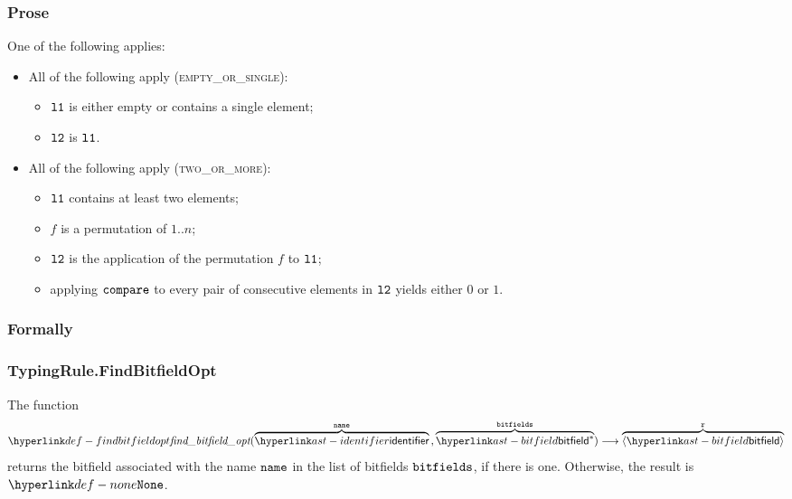 \subsubsection{Prose}
One of the following applies:
\begin{itemize}
  \item All of the following apply (\textsc{empty\_or\_single}):
  \begin{itemize}
    \item $\texttt{l1}$ is either empty or contains a single element;
    \item $\texttt{l2}$ is $\texttt{l1}$.
  \end{itemize}

  \item All of the following apply (\textsc{two\_or\_more}):
  \begin{itemize}
    \item $\texttt{l1}$ contains at least two elements;
    \item $f$ is a permutation of $1..n$;
    \item $\texttt{l2}$ is the application of the permutation $f$ to $\texttt{l1}$;
    \item applying $\texttt{compare}$ to every pair of consecutive elements in $\texttt{l2}$ yields either $0$ or $1$.
  \end{itemize}
\end{itemize}

\subsubsection{Formally}

\subsubsection{TypingRule.FindBitfieldOpt}
\hypertarget{def-findbitfieldopt}{}
The function
\[
  \findbitfieldopt(\overname{\identifier}{\name} \aslsep \overname{\bitfield^*}{\bitfields})
  \aslto \overname{\langle\bitfield\rangle}{\vr}
\]
returns the bitfield associated with the name $\texttt{name}$ in the list of bitfields $\texttt{bitfields}$,
if there is one. Otherwise, the result is $\None$.

